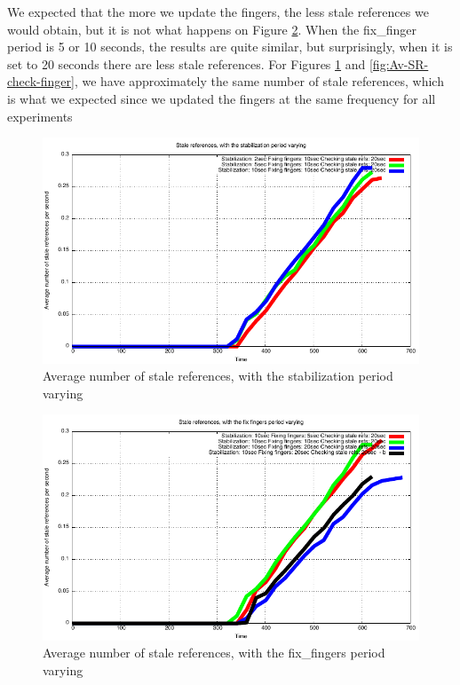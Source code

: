 \documentclass[a4paper, 11pt]{article}
\theoremstyle{plain}
\theoremstyle{definition}
\begin{document}
    We expected that the more we update the fingers, the less stale references we would obtain, but it is not
    what happens on Figure \ref{fig:Av-SR-fix-fingers}. When the fix\_finger period is 5 or 10 seconds, the
    results are quite similar, but surprisingly, when it is set to 20 seconds there are less stale
    references. For Figures \ref{fig:Av-SR-stab} and \ref{fig:Av-SR-check-finger}, we have approximately the
    same number of stale references, which is what we expected since we updated the fingers at the same
    frequency for all experiments

    \begin{figure}[h]
      \centering
      \includegraphics{plots/Average-SR-stabilization.pdf}
      \caption{Average number of stale references, with the stabilization period varying}
      \label{fig:Av-SR-stab}
    \end{figure}
    
    
    \begin{figure}[h]
      \centering
      \includegraphics{plots/Average-SR-fix-fingers.pdf}
      \caption{Average number of stale references, with the fix\_fingers period varying}
      \label{fig:Av-SR-fix-fingers}
    \end{figure}
    
\end{document}
